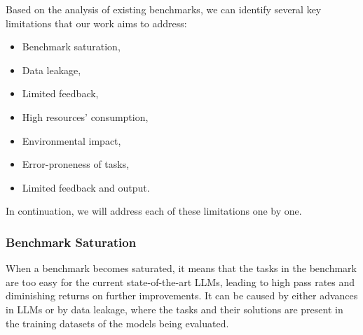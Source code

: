 

Based on the analysis of existing benchmarks, we can identify several key limitations that our work aims to address:
\begin{itemize}
    \item Benchmark saturation,
    \item Data leakage,
    \item Limited feedback,
    \item High resources' consumption,
    \item Environmental impact,
    \item Error-proneness of tasks,
    \item Limited feedback and output.
\end{itemize}

In continuation, we will address each of these limitations one by one.

\subsubsection{Benchmark Saturation}

When a benchmark becomes saturated, it means that the tasks in the benchmark are too easy for the current state-of-the-art LLMs, leading to high pass rates and diminishing returns on further improvements.
It can be caused by either advances in LLMs or by data leakage, where the tasks and their solutions are present in the training datasets of the models being evaluated.


